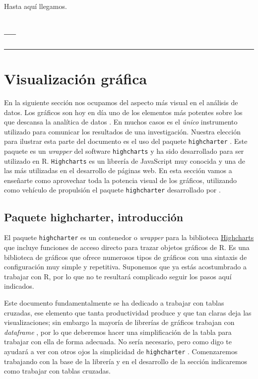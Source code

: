 \documentclass[
]{book}
\begin{document}
Hasta aquí llegamos.

\hypertarget{section}{%
\section{---}\label{section}}

\begin{center}\rule{0.5\linewidth}{0.5pt}\end{center}

\hypertarget{tse08}{%
\chapter{Visualización gráfica}\label{tse08}}

En la siguiente sección nos ocupamos del aspecto más visual en el análisis de datos. Los gráficos son hoy en día uno de los elementos más potentes sobre los que descansa la analítica de datos \citep{kuan2015learning} . En muchos casos es el \emph{único} instrumento utilizado para comunicar los resultados de una investigación. Nuestra elección para ilustrar esta parte del documento es el uso del paquete \texttt{highcharter} . Este paquete es un \emph{wrapper} del software \texttt{highcharts} y ha sido desarrollado para ser utilizado en R. \texttt{Highcharts} es un librería de JavaScript muy conocida y una de las más utilizadas en el desarrollo de páginas web. En esta sección vamos a enseñarte como aprovechar toda la potencia visual de los gráficos, utilizando como vehículo de propulsión el paquete \texttt{highcharter} desarrollado por \citep{highcharter}.

\hypertarget{paquete-highcharter-introducciuxf3n}{%
\section{Paquete highcharter, introducción}\label{paquete-highcharter-introducciuxf3n}}

El paquete \texttt{highcharter} es un contenedor o \emph{wrapper} para la biblioteca \href{https://www.highcharts.com/}{Highcharts} que incluye funciones de acceso directo para trazar objetos gráficos de R. Es una biblioteca de gráficos que ofrece numerosos tipos de gráficos con una sintaxis de configuración muy simple y repetitiva. Suponemos que ya estás acostumbrado a trabajar con R, por lo que no te resultará complicado seguir los pasos aquí indicados.

Este documento fundamentalmente se ha dedicado a trabajar con tablas cruzadas, ese elemento que tanta productividad produce y que tan claras deja las visualizaciones; sin embargo la mayoría de librerías de gráficos trabajan con \emph{dataframe} , por lo que deberemos hacer una simplificación de la tabla para trabajar con ella de forma adecuada. No sería necesario, pero como digo te ayudará a ver con otros ojos la simplicidad de \texttt{highcharter} . Comenzaremos trabajando con la base de la librería y en el desarrollo de la sección indicaremos como trabajar con tablas cruzadas.
\end{document}
